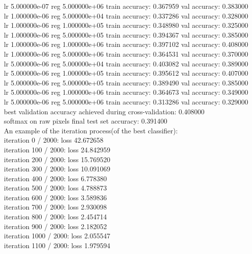 \documentclass{article}
\begin{document}
lr 5.000000e-07 reg 5.000000e+06 train accuracy: 0.367959 val accuracy: 0.383000\\
lr 1.000000e-06 reg 5.000000e+04 train accuracy: 0.337286 val accuracy: 0.328000\\
lr 1.000000e-06 reg 1.000000e+05 train accuracy: 0.348980 val accuracy: 0.325000\\
lr 1.000000e-06 reg 5.000000e+05 train accuracy: 0.394367 val accuracy: 0.385000\\
lr 1.000000e-06 reg 1.000000e+06 train accuracy: 0.397102 val accuracy: 0.408000\\
lr 1.000000e-06 reg 5.000000e+06 train accuracy: 0.364531 val accuracy: 0.370000\\
lr 5.000000e-06 reg 5.000000e+04 train accuracy: 0.403082 val accuracy: 0.389000\\
lr 5.000000e-06 reg 1.000000e+05 train accuracy: 0.395612 val accuracy: 0.407000\\
lr 5.000000e-06 reg 5.000000e+05 train accuracy: 0.389490 val accuracy: 0.385000\\
lr 5.000000e-06 reg 1.000000e+06 train accuracy: 0.364673 val accuracy: 0.349000\\
lr 5.000000e-06 reg 5.000000e+06 train accuracy: 0.313286 val accuracy: 0.329000\\
best validation accuracy achieved during cross-validation: 0.408000\\
softmax on raw pixels final test set accuracy: 0.391400\\[10pt]
An example of the iteration process(of the best classifier):\\
iteration 0 / 2000: loss 42.672658\\
iteration 100 / 2000: loss 24.842959\\
iteration 200 / 2000: loss 15.769520\\
iteration 300 / 2000: loss 10.091069\\
iteration 400 / 2000: loss 6.778380\\
iteration 500 / 2000: loss 4.788873\\
iteration 600 / 2000: loss 3.589836\\
iteration 700 / 2000: loss 2.930098\\
iteration 800 / 2000: loss 2.454714\\
iteration 900 / 2000: loss 2.182052\\
iteration 1000 / 2000: loss 2.055547\\
iteration 1100 / 2000: loss 1.979594\\
\end{document}

